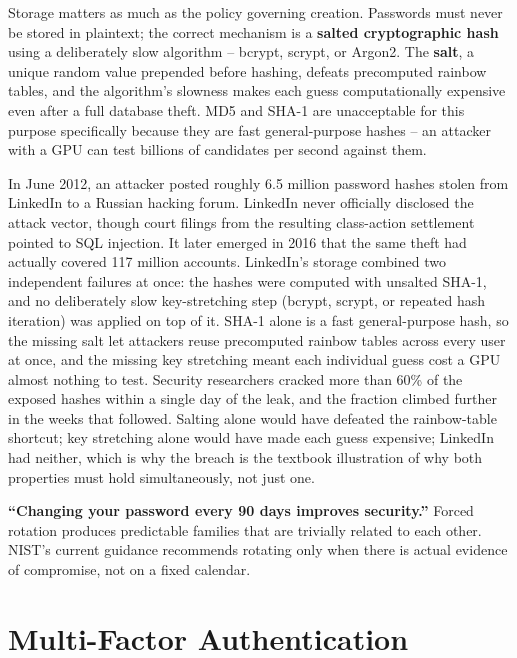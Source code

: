Storage matters as much as the policy governing creation. Passwords must never be stored in
plaintext; the correct mechanism is a \textbf{salted cryptographic hash} using a deliberately slow
algorithm -- bcrypt, scrypt, or Argon2. The \textbf{salt}, a unique random value prepended before
hashing, defeats precomputed rainbow tables, and the algorithm's slowness makes each guess
computationally expensive even after a full database theft. MD5 and SHA-1 are unacceptable for
this purpose specifically because they are fast general-purpose hashes -- an attacker with a GPU
can test billions of candidates per second against them.

\begin{example}
In June 2012, an attacker posted roughly 6.5 million password hashes stolen from LinkedIn to a
Russian hacking forum. LinkedIn never officially disclosed the attack vector, though court filings
from the resulting class-action settlement pointed to SQL injection. It later emerged in 2016 that
the same theft had actually covered 117 million accounts. LinkedIn's storage
combined two independent failures at once: the hashes were computed with unsalted SHA-1, and no
deliberately slow key-stretching step (bcrypt, scrypt, or repeated hash iteration) was applied on
top of it. SHA-1 alone is a fast general-purpose hash, so the missing salt let attackers reuse
precomputed rainbow tables across every user at once, and the missing key stretching meant each
individual guess cost a GPU almost nothing to test. Security researchers cracked more than 60\% of
the exposed hashes within a single day of the leak, and the fraction climbed further in the weeks
that followed. Salting alone would have defeated the rainbow-table shortcut; key
stretching alone would have made each guess expensive; LinkedIn had neither, which is why the
breach is the textbook illustration of why both properties must hold simultaneously, not just one.
\end{example}

\begin{misconception}
\textbf{``Changing your password every 90 days improves security.''} Forced rotation produces
predictable families that are trivially related to each other. NIST's current guidance recommends
rotating only when there is actual evidence of compromise, not on a fixed calendar.
\end{misconception}

\section{Multi-Factor Authentication}

